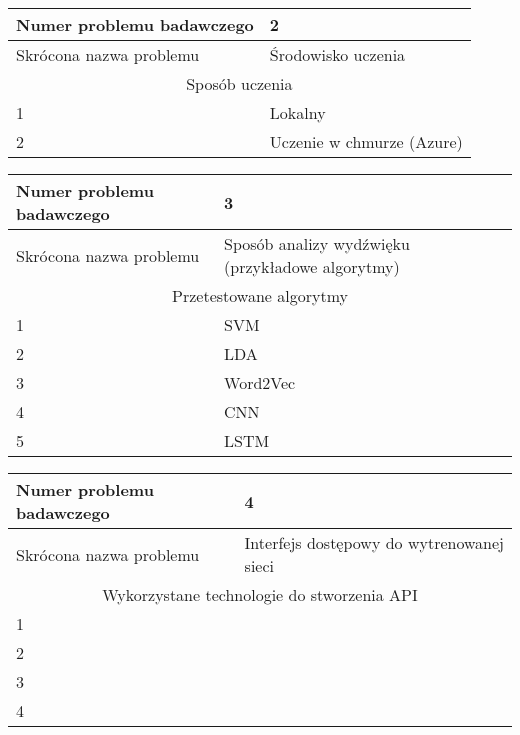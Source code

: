 \documentclass[11pt,a4paper]{article}
\begin{document}
\begin{center}
\end{center}
\begin{table}[h]
    \centering
    \begin{tabular}{|p{4.5cm}|p{9cm}|}
        \hline
         Numer problemu badawczego & 2 \\
         \hline
         Skrócona nazwa problemu & Środowisko uczenia\\
         \hline
         \multicolumn{2}{|c|}{Sposób uczenia} \\ \hline
         1 & Lokalny \\ \hline
         2 &  Uczenie w chmurze (Azure)\\ \hline
    \end{tabular}
    \label{tab:my_label2}
\end{table}


\begin{table}[h]
    \centering
    \begin{tabular}{|p{4.5cm}|p{9cm}|}
        \hline
         Numer problemu badawczego & 3 \\
         \hline
         Skrócona nazwa problemu & Sposób analizy wydźwięku (przykładowe algorytmy)\\
         \hline
         \multicolumn{2}{|c|}{Przetestowane algorytmy} \\ \hline
         1 &   SVM  \\ \hline
         2 &   LDA\\ \hline
         3 &   Word2Vec\\ \hline
         4 &   CNN\\ \hline
         5 &   LSTM\\ \hline 
    \end{tabular}
    \label{tab:my_label3}
\end{table}

\begin{table}[h]
    \centering
    \begin{tabular}{|p{4.5cm}|p{9cm}|}
        \hline
         Numer problemu badawczego & 4 \\
         \hline
         Skrócona nazwa problemu & Interfejs dostępowy do wytrenowanej sieci\\
         \hline
         \multicolumn{2}{|c|}{Wykorzystane technologie do stworzenia API} \\ \hline
         1 &  \\ \hline
         2 &  \\ \hline
         3 &  \\ \hline
         4 &  \\ \hline
    \end{tabular}
    \label{tab:my_label4}
\end{table}
\end{document}
